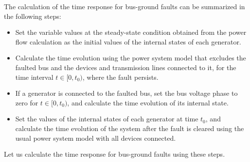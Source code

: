\documentclass[graybox, envcountchap]{svmult}
\begin{document}
The calculation of the time response for bus-ground faults can be summarized in
the following steps:

\medskip
\begin{breakbox}
\begin{itemize}
  \item[(a)] Set the variable values at the steady-state condition obtained from
  the power flow calculation as the initial values of the internal states of each
  generator. 
  \item[(b)] Calculate the time evolution using the power system model that
  excludes the faulted bus and the devices and transmission lines connected to it,
  for the time interval $t \in [0, t_0)$, where the fault persists.
  \item[(c)] If a generator is connected to the faulted bus, set the bus voltage
  phase to zero for $t \in [0, t_0)$, and calculate the time evolution of its
  internal state.
  \item[(d)] Set the values of the internal states of each generator at time
  $t_0$, and calculate the time evolution of the system after the fault is cleared
  using the usual power system model with all devices connected. 
\end{itemize}
\end{breakbox}
\medskip

Let us calculate the time response for bus-ground faults using these steps.
\end{document}
